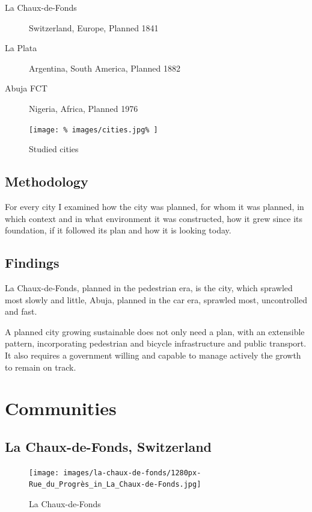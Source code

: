 \documentclass{article}
\begin{document}
		\begin{description}
			\item [La Chaux-de-Fonds] Switzerland, Europe, Planned 1841
			\item [La Plata] Argentina, South America, Planned 1882
			\item [Abuja FCT] Nigeria, Africa, Planned 1976
		\end{description}
		
		\begin{figure}[H]
			\texttt{[image: \%
				images/cities.jpg\%
			]}
			\caption{Studied cities \cite{BingMaps:Cities}}
			\label{fig:map:analyzed-cities}
		\end{figure}

		\subsection{Methodology}
		For every city I examined how the city was planned, for whom it was planned, in which context and in what environment it was constructed, how it grew since its foundation, if it followed its plan and how it is looking today.

		\subsection{Findings}
		La Chaux-de-Fonds, planned in the pedestrian era, is the city, which sprawled most slowly and little, Abuja, planned in the car era, sprawled most, uncontrolled and fast.
		
		A planned city growing sustainable does not only need a plan, with an extensible pattern, incorporating pedestrian and bicycle infrastructure and public transport. It also requires a government willing and capable to manage actively the growth to remain on track.



	\clearpage	
	\section{Communities}
	
		\subsection{La Chaux-de-Fonds, Switzerland}		
		\begin{figure}[H]
	 		\texttt{[image: images/la-chaux-de-fonds/1280px-Rue\_du\_Progrès\_in\_La\_Chaux-de-Fonds.jpg]}
 			\caption{La Chaux-de-Fonds \cite{Wikimedia:RueDuProgressLaChauxDeFonds}}
 			\label{fig:img:la-chaux-de-fonds}
	 	\end{figure}
		
\end{document}
